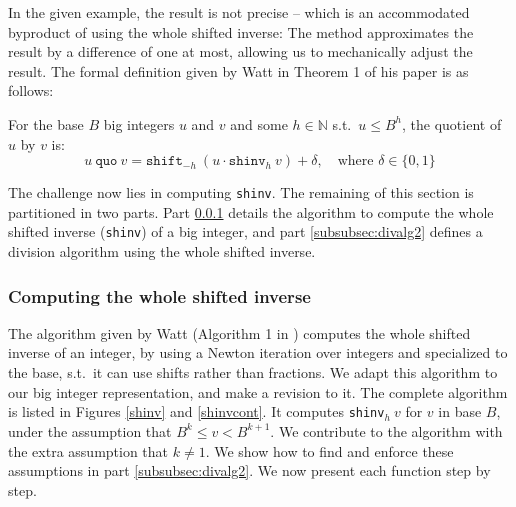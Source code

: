 In the given example, the result is not precise -- which is an accommodated
byproduct of using the whole shifted inverse: The method approximates the result
by a difference of one at most, allowing us to mechanically adjust the result.
The formal definition given by Watt in Theorem 1 of his paper
\cite{watt2023efficient} is as follows:

\begin{definition}\label{def:quo}
  For the base $B$ big integers $u$ and $v$ and some $h\in \mathbb{N}$ s.t.\
  $u \leq B^h$, the quotient of $u$ by $v$ is:
  \begin{equation}
    \label{eq:defquo}
    u~\mathtt{quo}~v = \mathtt{shift}_{-h}~ (u \cdot \mathtt{shinv}_h~v) + \delta,\quad \text{where~} \delta \in \{0,1\}
  \end{equation}
\end{definition}

The challenge now lies in computing \texttt{shinv}. The remaining of this
section is partitioned in two parts. Part \ref{subsubsec:divalg1} details the
algorithm to compute the whole shifted inverse (\texttt{shinv}) of a big
integer, and part \ref{subsubsec:divalg2} defines a division algorithm using the
whole shifted inverse.

\subsubsection{Computing the whole shifted inverse}\label{subsubsec:divalg1}
The algorithm given by Watt (Algorithm 1 in \cite{watt2023efficient}) computes
the whole shifted inverse of an integer, by using a Newton iteration over
integers and specialized to the base, s.t.\ it can use shifts rather than
fractions. We adapt this algorithm to our big integer representation, and make
a revision to it. The complete algorithm is listed in Figures \ref{shinv} and
\ref{shinvcont}. It computes \texttt{shinv}$_h~v$ for $v$ in base $B$, under the
assumption that $B^k \leq v < B^{k+1}$. We contribute to the algorithm with the
extra assumption that $k\neq 1$. We show how to find and enforce these assumptions
in part \ref{subsubsec:divalg2}. We now present each function step by step.

